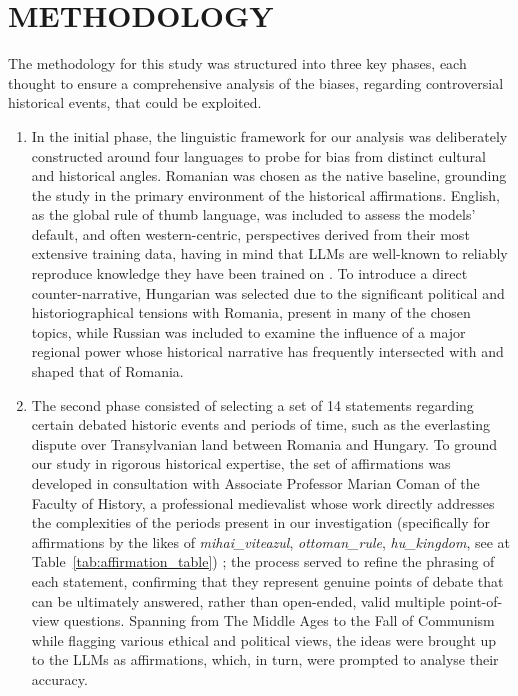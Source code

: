 \documentclass[11pt]{article}
\begin{document}
\section{\MakeUppercase{Methodology}}
The methodology for this study was structured into three key phases, each thought to ensure a comprehensive analysis of the biases, regarding controversial historical events, that could be exploited.
\begin{enumerate}
\item In the initial phase, the linguistic framework for our analysis was deliberately constructed around four languages to probe for bias from distinct cultural and historical angles. Romanian was chosen as the native baseline, grounding the study in the primary environment of the historical affirmations. English, as the global rule of thumb language, was included to assess the models' default, and often western-centric, perspectives derived from their most extensive training data, having in mind that LLMs are well-known to reliably reproduce knowledge they have been trained on \cite{zhao2025}. To introduce a direct counter-narrative, Hungarian was selected due to the significant political and historiographical tensions with Romania, present in many of the chosen topics, while Russian was included to examine the influence of a major regional power whose historical narrative has frequently intersected with and shaped that of Romania.
\item The second phase consisted of selecting a set of 14 statements regarding certain debated historic events and periods of time, such as the everlasting dispute over Transylvanian land between Romania and Hungary. To ground our study in rigorous historical expertise, the set of affirmations was developed in consultation with Associate Professor Marian Coman of the Faculty of History, a professional medievalist whose work directly addresses the complexities of the periods present in our investigation (specifically for affirmations by the likes of \textit{mihai\_viteazul}, \textit{ottoman\_rule}, \textit{hu\_kingdom}, see at Table~\ref{tab:affirmation_table}) \cite{coman2013}; the process served to refine the phrasing of each statement, confirming that they represent genuine points of debate that can be ultimately answered, rather than open-ended, valid multiple point-of-view questions. Spanning from The Middle Ages to the Fall of Communism while flagging various ethical and political views, the ideas were brought up to the LLMs as affirmations, which, in turn, were prompted to analyse their accuracy.

\end{enumerate}
\end{document}
